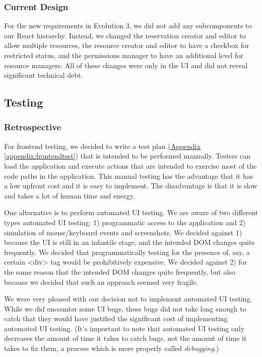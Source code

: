 \documentclass[12pt]{article}
\begin{document}
\subsubsection{Current Design}
For the new requirements in Evolution 3, we did not add any subcomponents to our React hierarchy. Instead, we changed the reservation creator and editor to allow multiple resources, the resource creator and editor to have a checkbox for restricted status, and the permissions manager to have an additional level for resource managers. All of these changes were only in the UI and did not reveal significant technical debt.

\subsection{Testing}
\subsubsection{Retrospective}
For frontend testing, we decided to write a test plan (\hyperref[appendix:frontendtest]{Appendix \ref{appendix:frontendtest}}) that is intended to be performed manually. Testers can load the application and execute actions that are intended to exercise most of the code paths in the application. This manual testing has the advantage that it has a low upfront cost and it is easy to implement. The disadvantage is that it is slow and takes a lot of human time and energy.

One alternative is to perform automated UI testing. We are aware of two different types automated UI testing: 1) programmatic access to the application and 2) simulation of mouse/keyboard events and screenshots. We decided against 1) because the UI is still in an infantile stage, and the intended DOM changes quite frequently. We decided that programmatically testing for the presence of, say, a certain <div> tag would be prohibitively expensive. We decided against 2) for the same reason that the intended DOM changes quite frequently, but also because we decided that such an approach seemed very fragile.

We were very pleased with our decision not to implement automated UI testing. While we did encounter some UI bugs, these bugs did not take long enough to catch that they would have justified the significant cost of implementing automated UI testing. (It's important to note that automated UI testing only decreases the amount of time it takes to catch bugs, not the amount of time it takes to fix them, a process which is more properly called \emph{debugging}.)
\end{document}

